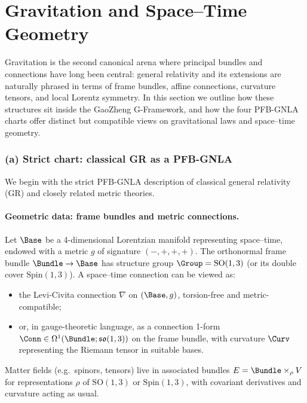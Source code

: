 \documentclass[11pt]{book}
\theoremstyle{plain}
\theoremstyle{definition}
\begin{document}
\section{Gravitation and Space--Time Geometry}


Gravitation is the second canonical arena where principal bundles and
connections have long been central: general relativity and its
extensions are naturally phrased in terms of frame bundles, affine
connections, curvature tensors, and local Lorentz symmetry. In this
section we outline how these structures sit inside the GaoZheng
G-Framework, and how the four PFB-GNLA charts offer distinct but
compatible views on gravitational laws and space--time geometry.



\subsubsection*{(a) Strict chart: classical GR as a PFB-GNLA}

We begin with the strict PFB-GNLA description of classical general
relativity (GR) and closely related metric theories.

\paragraph{Geometric data: frame bundles and metric connections.}

Let $\Base$ be a 4-dimensional Lorentzian manifold representing
space--time, endowed with a metric $g$ of signature $(-,+,+,+)$. The
orthonormal frame bundle $\Bundle\to\Base$ has structure group
$\Group=\mathrm{SO}(1,3)$ (or its double cover $\mathrm{Spin}(1,3)$).
A space--time connection can be viewed as:

\begin{itemize}
  \item the Levi-Civita connection $\nabla$ on $(\Base,g)$,
        torsion-free and metric-compatible;
  \item or, in gauge-theoretic language, as a connection 1-form
        $\Conn\in\Omega^1(\Bundle;\mathfrak{so}(1,3))$ on the frame
        bundle, with curvature $\Curv$ representing the Riemann tensor
        in suitable bases.
\end{itemize}

Matter fields (e.g.\ spinors, tensors) live in associated bundles
$E=\Bundle\times_\rho V$ for representations $\rho$ of
$\mathrm{SO}(1,3)$ or $\mathrm{Spin}(1,3)$, with covariant derivatives
and curvature acting as usual.
\end{document}

